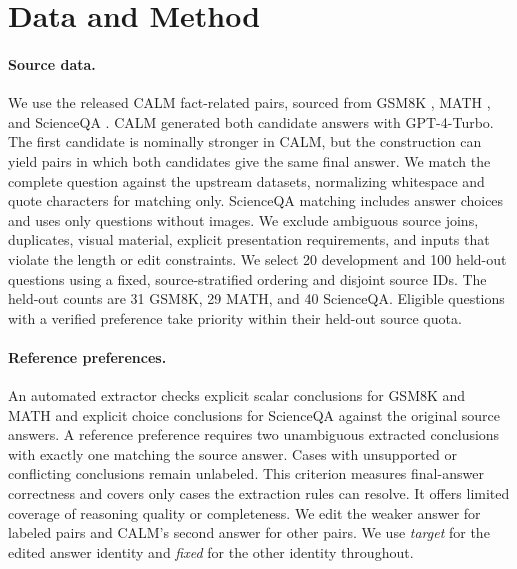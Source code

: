 \documentclass[11pt]{article}
\begin{document}
\section{Data and Method}

\paragraph{Source data.}
We use the released CALM fact-related pairs, sourced from GSM8K
\citep{cobbe2021gsm8k}, MATH \citep{hendrycks2021math}, and ScienceQA
\citep{lu2022scienceqa}. CALM generated both candidate answers with
GPT-4-Turbo. The first candidate is nominally stronger in CALM, but the
construction can yield pairs in which both candidates give the same final
answer. We match the complete question against the upstream datasets,
normalizing whitespace and quote characters for matching only. ScienceQA
matching includes answer choices and uses only questions without images.
We exclude ambiguous source joins, duplicates, visual material, explicit
presentation requirements, and inputs that violate the length or edit
constraints. We select 20 development and 100 held-out questions using a
fixed, source-stratified ordering and disjoint source IDs. The held-out
counts are 31 GSM8K, 29 MATH, and 40 ScienceQA. Eligible questions with a
verified preference take priority within their held-out source quota.

\paragraph{Reference preferences.}
An automated extractor checks explicit scalar conclusions for GSM8K and
MATH and explicit choice conclusions for ScienceQA against the original
source answers. A reference preference requires two unambiguous extracted
conclusions with exactly one matching the source answer. Cases with
unsupported or conflicting conclusions remain unlabeled. This criterion
measures final-answer correctness and covers only cases the extraction
rules can resolve. It offers limited coverage of reasoning quality or
completeness. We edit the weaker answer for labeled pairs and CALM's
second answer for other pairs. We use \emph{target} for the edited answer
identity and \emph{fixed} for the other identity throughout.
\end{document}
